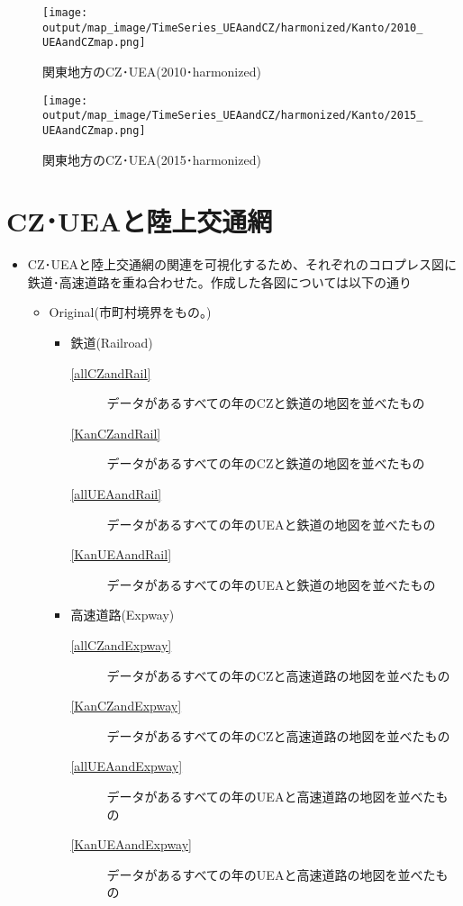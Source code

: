 \documentclass{ltjsarticle}
\begin{document}
  \begin{figure}[pbth]
    \centering
    \texttt{[image: output/map\_image/TimeSeries\_UEAandCZ/harmonized/Kanto/2010\_UEAandCZmap.png]}
    \caption{\label{ham:tsK2010}関東地方のCZ･UEA(2010･harmonized)}
  \end{figure}
  
  \begin{figure}[pbth]
    \centering
    \texttt{[image: output/map\_image/TimeSeries\_UEAandCZ/harmonized/Kanto/2015\_UEAandCZmap.png]}
    \caption{\label{ham:tsK2015}関東地方のCZ･UEA(2015･harmonized)}
  \end{figure}
  
\clearpage

\section{CZ･UEAと陸上交通網}
\begin{itemize}
  \item CZ･UEAと陸上交通網の関連を可視化するため、それぞれのコロプレス図に鉄道･高速道路を重ね合わせた。作成した各図については以下の通り
  \begin{itemize}
    \item Original(市町村境界をもの。)
    \begin{itemize}
      \item 鉄道(Railroad)
      \begin{description}
        \item[\ref{allCZandRail}] データがあるすべての年のCZと鉄道の地図を並べたもの
        \item[\ref{KanCZandRail}] データがあるすべての年のCZと鉄道の地図を並べたもの
        \item[\ref{allUEAandRail}] データがあるすべての年のUEAと鉄道の地図を並べたもの
        \item[\ref{KanUEAandRail}] データがあるすべての年のUEAと鉄道の地図を並べたもの
      \end{description}
      \item 高速道路(Expway)
      \begin{description}
        \item[\ref{allCZandExpway}] データがあるすべての年のCZと高速道路の地図を並べたもの
        \item[\ref{KanCZandExpway}] データがあるすべての年のCZと高速道路の地図を並べたもの
        \item[\ref{allUEAandExpway}] データがあるすべての年のUEAと高速道路の地図を並べたもの
        \item[\ref{KanUEAandExpway}] データがあるすべての年のUEAと高速道路の地図を並べたもの
      \end{description}
    \end{itemize}
  \end{itemize}
\end{itemize}
\end{document}
